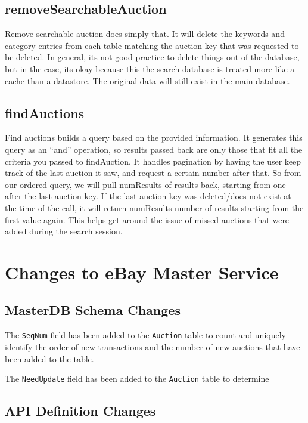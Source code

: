 \documentclass[12pt,a4paper]{article}
\begin{document}
\subsection{removeSearchableAuction}
Remove searchable auction does simply that. It will delete the keywords and
category entries from each table matching the auction key that was requested to
be deleted. In general, its not good practice to delete things out of the
database, but in the case, its okay because this the search database is treated
more like a cache than a datastore. The original data will still exist in the
main database.

\subsection{findAuctions}
Find auctions builds a query based on the provided information. It generates
this query as an ``and'' operation, so results passed back are only those that
fit all the criteria you passed to findAuction. It handles pagination by having
the user keep track of the last auction it saw, and request a certain number
after that. So from our ordered query, we will pull numResults of results back,
starting from one after the last auction key. If the last auction key was
deleted/does not exist at the time of the call, it will return numResults
number of results starting from the first value again. This helps get around
the issue of missed auctions that were added during the search session.

\pagebreak
\section{Changes to eBay Master Service}

\subsection{MasterDB Schema Changes}
The \texttt{SeqNum} field has been added to the \texttt{Auction} table to count and
uniquely identify the order of new transactions and the number of new auctions 
that have been added to the table. 

The \texttt{NeedUpdate} field has been added to the \texttt{Auction} table to 
determine 

\subsection{API Definition Changes}
\end{document}
